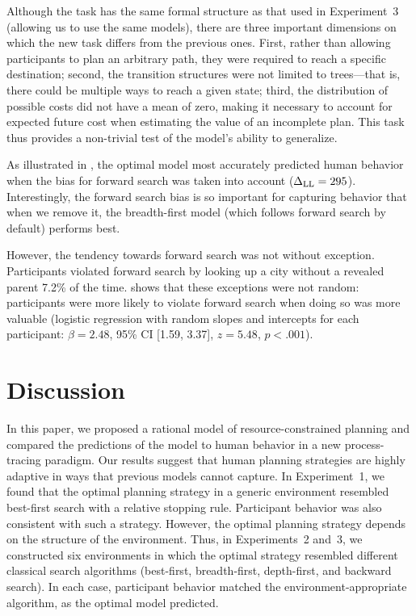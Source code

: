 Although the task has the same formal structure as that used in Experiment~3 (allowing us to use the same models), there are three important dimensions on which the new task differs from the previous ones. First, rather than allowing participants to plan an arbitrary path, they were required to reach a specific destination; second, the transition structures were not limited to trees---that is, there could be multiple ways to reach a given state; third, the distribution of possible costs did not have a mean of zero, making it necessary to account for expected future cost when estimating the value of an incomplete plan. This task thus provides a non-trivial test of the model's ability to generalize.

As illustrated in , the optimal model most accurately predicted human behavior when the bias for forward search was taken into account ($\Delta_{\mathrm{LL}} = 295$). Interestingly, the forward search bias is so important for capturing behavior that when we remove it, the breadth-first model (which follows forward search by default) performs best. 

However, the tendency towards forward search was not without exception. Participants violated forward search by looking up a city without a revealed parent 7.2\% of the time.  shows that these exceptions were not random: participants were more likely to violate forward search when doing so was more valuable (logistic regression with random slopes and intercepts for each participant: $\beta = 2.48$, 95\% CI [1.59, 3.37], $z = 5.48$, $p < .001$).

\section{Discussion}\label{sec:planning-discussion}

In this paper, we proposed a rational model of resource-constrained planning and compared the predictions of the model to human behavior in a new process-tracing paradigm. Our results suggest that human planning strategies are highly adaptive in ways that previous models cannot capture. In Experiment~1, we found that the optimal planning strategy in a generic environment resembled best-first search with a relative stopping rule. Participant behavior was also consistent with such a strategy. However, the optimal planning strategy depends on the structure of the environment. Thus, in Experiments~2 and~3, we constructed six environments in which the optimal strategy resembled different classical search algorithms (best-first, breadth-first, depth-first, and backward search). In each case, participant behavior matched the environment-appropriate algorithm, as the optimal model predicted.

